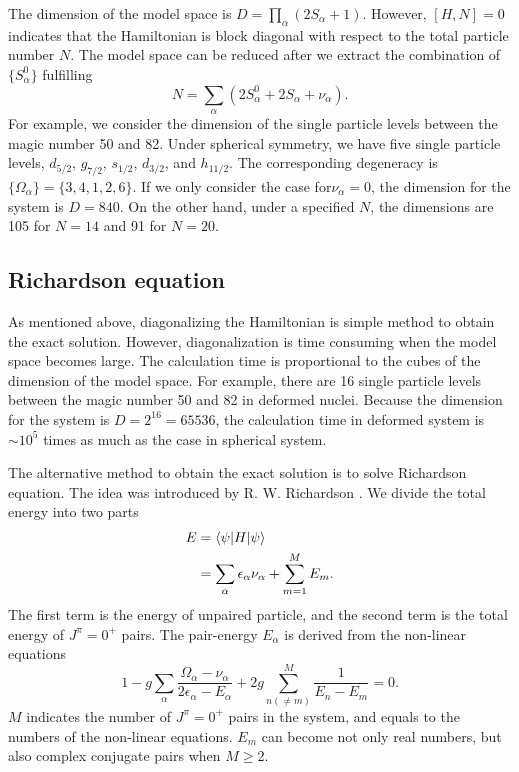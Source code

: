 \documentclass[11pt]{book} %
\begin{document}
The dimension of the model space is $D=\prod_{\alpha}(2S_{\alpha}+1)$. However, $[H,N]=0$ indicates that the Hamiltonian is block diagonal with respect to the total particle number $N$. The model space can be reduced after we extract the combination of $\{S_{\alpha}^0\}$ fulfilling
\begin{equation}
  N = \sum_{\alpha} (2S_{\alpha}^0+2S_{\alpha}+\nu_{\alpha}) .
\end{equation} 
For example, we consider the dimension of the single particle levels between the magic number 50 and 82. Under spherical symmetry, we have five single particle levels, $d_{5/2}$, $g_{7/2}$, $s_{1/2}$, $d_{3/2}$, and $h_{11/2}$. The corresponding degeneracy is $\{\Omega_{\alpha}\}=\{3,4,1,2,6\}$. If we only consider the case for$\nu_{\alpha}=0$, the dimension for the system is $D=840$. On the other hand, under a specified $N$, the dimensions are 105 for $N=14$ and 91 for $N=20$.

\subsection{Richardson equation}
As mentioned above, diagonalizing the Hamiltonian is simple method to obtain the exact solution.
However, diagonalization is time consuming when the model space becomes large. The calculation time is proportional to the cubes of the dimension of the model space. For example, there are 16 single particle levels between the magic number 50 and 82 in deformed nuclei. Because the dimension for the system is $D=2^{16}=65536$, the calculation time in deformed system is $\sim 10^5$ times as much as the case in spherical system. \par
The alternative method to obtain the exact solution is to solve Richardson equation. The idea was introduced by R. W. Richardson \cite{Richardson1, Richardson2, Richardson3, Richardson4, Richardson5}. We divide the total energy into two parts
\begin{align}
  E &= \braket{\psi|H|\psi} \\
  &= \sum_{\alpha} \epsilon_{\alpha} \nu_{\alpha} + \sum_{m=1}^M E_{m} .
\end{align}
The first term is the energy of unpaired particle, and the second term is the total energy of $J^{\pi}=0^+$ pairs. The pair-energy $E_{\alpha}$ is derived from the non-linear equations
\begin{equation}
  1 - g\sum_{\alpha} \frac{\Omega_{\alpha}-\nu_{\alpha}}{2\epsilon_{\alpha}-E_{\alpha}} + 2g\sum_{n(\neq m)}^M \frac{1}{E_{n}-E_{m}} = 0 .
\end{equation}
$M$ indicates the number of $J^{\pi}=0^+$ pairs in the system, and equals to the numbers of the non-linear equations. $E_{m}$ can become not only real numbers, but also complex conjugate pairs when $M\ge 2$. 
\end{document}
